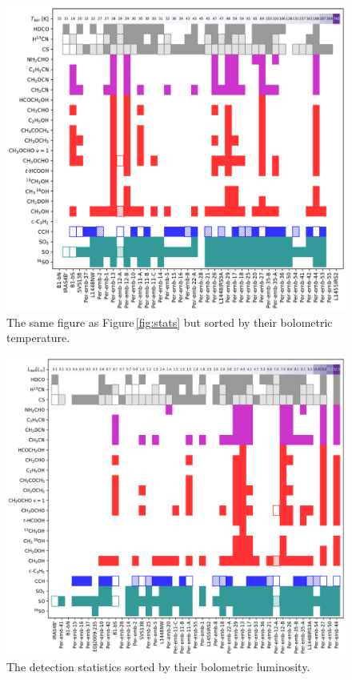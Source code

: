 \documentclass[twocolumn]{aastex62}
\begin{document}
\renewcommand{\thefigure}{\arabic{figure} (Cont.)}
\addtocounter{figure}{-1}
\begin{figure}[htbp!]
  \includegraphics[width=\textwidth]{stats_sorted_by_tbol.pdf}
  \caption{The same figure as Figure\,\ref{fig:stats} but sorted by their bolometric temperature.}
\end{figure}

\addtocounter{figure}{-1}
\begin{figure}[htbp!]
  \centering
  \includegraphics[width=\textwidth]{stats_sorted_by_lbol.pdf}
  \caption{The detection statistics sorted by their bolometric luminosity.}
\end{figure}
\end{document}
